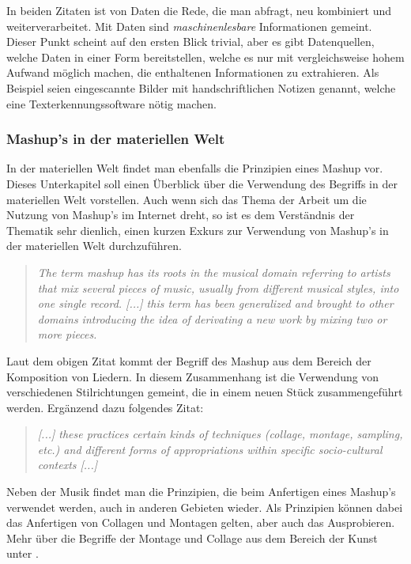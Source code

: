 \documentclass[11pt]{article}
\newcommand{\com}[1]{\marginpar{\em {\small{#1}}}} %
\begin{document}
In beiden Zitaten ist von Daten die Rede, die man abfragt, neu kombiniert und weiterverarbeitet. Mit Daten sind \textit{maschinenlesbare} Informationen gemeint. Dieser Punkt scheint auf den ersten Blick trivial, aber es gibt Datenquellen, welche Daten in einer Form bereitstellen, welche es nur mit vergleichsweise hohem Aufwand möglich machen, die enthaltenen Informationen zu extrahieren. Als Beispiel seien eingescannte Bilder mit handschriftlichen Notizen genannt, welche eine Texterkennungssoftware nötig machen.

%
%
\subsubsection{Mashup's in der materiellen Welt}

In der materiellen Welt findet man ebenfalls die Prinzipien eines Mashup vor. Dieses Unterkapitel soll  einen Überblick über die Verwendung des Begriffs in der materiellen Welt vorstellen. Auch wenn sich das Thema der Arbeit um die Nutzung von Mashup's im Internet dreht, so ist es dem Verständnis der Thematik sehr dienlich, einen kurzen Exkurs zur Verwendung von Mashup's in der materiellen Welt durchzuführen.

\begin{quote}
    \emph{The term mashup has its roots in the musical domain referring to artists that mix several pieces of music, usually from different musical styles, into one single record. [...] this term has been generalized and brought to other domains introducing the idea of derivating a new work by mixing two or more pieces.} \\
    \cite[S. 1 und 2]{MASHUP-ELUCID}
\end{quote}

\noindent
Laut dem obigen Zitat kommt der Begriff des Mashup\com{Ursprung Mashup} aus dem Bereich der Komposition von Liedern. In diesem Zusammenhang ist die Verwendung von verschiedenen Stilrichtungen gemeint, die in einem neuen Stück zusammengeführt werden. Ergänzend dazu folgendes Zitat:

%
%
\begin{quote}
    \emph{[...] these practices certain kinds of techniques (collage, montage, sampling, etc.) and different forms of appropriations within specific socio-cultural contexts [...]} \\ 
    \cite[S. 8]{MASHUP-REMIX-RECOM}
\end{quote}

\noindent
Neben der Musik findet man die Prinzipien, die beim Anfertigen eines Mashup's verwendet werden, auch in anderen Gebieten wieder. Als Prinzipien können dabei das Anfertigen von Collagen und Montagen gelten, aber auch das Ausprobieren. Mehr über die Begriffe der Montage und Collage aus dem Bereich der Kunst unter \cite[S. 11, S. 36]{COLLAGE-MONTAGE}.
\end{document}
